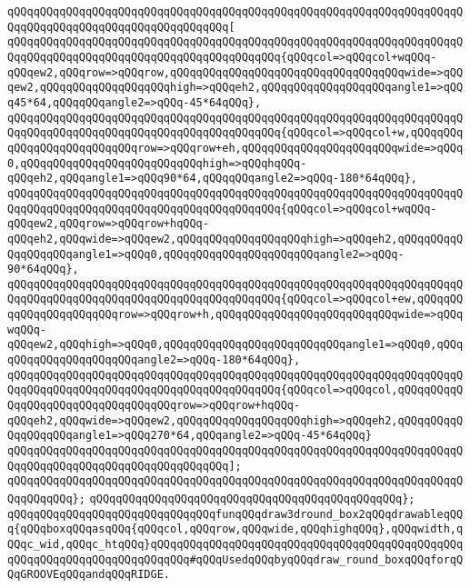 \verb|qQQqqQQqqQQqqQQqqQQqqQQqqQQqqQQqqQQqqQQqqQQqqQQqqQQqqQQqqQQqqQQqqQQqqQQqqQQqqQQqqQQqqQQqqQQqqQQqqQQqqQQq[|\newline
\verb|qQQqqQQqqQQqqQQqqQQqqQQqqQQqqQQqqQQqqQQqqQQqqQQqqQQqqQQqqQQqqQQqqQQqqQQqqQQqqQQqqQQqqQQqqQQqqQQqqQQqqQQqqQQqqQQq{qQQqcol=>qQQqcol+wqQQq-qQQqew2,qQQqrow=>qQQqrow,qQQqqQQqqQQqqQQqqQQqqQQqqQQqqQQqqQQqwide=>qQQqew2,qQQqqQQqqQQqqQQqqQQqhigh=>qQQqeh2,qQQqqQQqqQQqqQQqqQQqangle1=>qQQq45*64,qQQqqQQqangle2=>qQQq-45*64qQQq},|\newline
\verb|qQQqqQQqqQQqqQQqqQQqqQQqqQQqqQQqqQQqqQQqqQQqqQQqqQQqqQQqqQQqqQQqqQQqqQQqqQQqqQQqqQQqqQQqqQQqqQQqqQQqqQQqqQQqqQQq{qQQqcol=>qQQqcol+w,qQQqqQQqqQQqqQQqqQQqqQQqqQQqrow=>qQQqrow+eh,qQQqqQQqqQQqqQQqqQQqqQQqwide=>qQQq0,qQQqqQQqqQQqqQQqqQQqqQQqqQQqhigh=>qQQqhqQQq-qQQqeh2,qQQqangle1=>qQQq90*64,qQQqqQQqangle2=>qQQq-180*64qQQq},|\newline
\verb|qQQqqQQqqQQqqQQqqQQqqQQqqQQqqQQqqQQqqQQqqQQqqQQqqQQqqQQqqQQqqQQqqQQqqQQqqQQqqQQqqQQqqQQqqQQqqQQqqQQqqQQqqQQqqQQq{qQQqcol=>qQQqcol+wqQQq-qQQqew2,qQQqrow=>qQQqrow+hqQQq-qQQqeh2,qQQqwide=>qQQqew2,qQQqqQQqqQQqqQQqqQQqhigh=>qQQqeh2,qQQqqQQqqQQqqQQqqQQqangle1=>qQQq0,qQQqqQQqqQQqqQQqqQQqqQQqangle2=>qQQq-90*64qQQq},|\newline
\verb|qQQqqQQqqQQqqQQqqQQqqQQqqQQqqQQqqQQqqQQqqQQqqQQqqQQqqQQqqQQqqQQqqQQqqQQqqQQqqQQqqQQqqQQqqQQqqQQqqQQqqQQqqQQqqQQq{qQQqcol=>qQQqcol+ew,qQQqqQQqqQQqqQQqqQQqqQQqrow=>qQQqrow+h,qQQqqQQqqQQqqQQqqQQqqQQqqQQqwide=>qQQqwqQQq-qQQqew2,qQQqhigh=>qQQq0,qQQqqQQqqQQqqQQqqQQqqQQqqQQqangle1=>qQQq0,qQQqqQQqqQQqqQQqqQQqqQQqangle2=>qQQq-180*64qQQq},|\newline
\verb|qQQqqQQqqQQqqQQqqQQqqQQqqQQqqQQqqQQqqQQqqQQqqQQqqQQqqQQqqQQqqQQqqQQqqQQqqQQqqQQqqQQqqQQqqQQqqQQqqQQqqQQqqQQqqQQq{qQQqcol=>qQQqcol,qQQqqQQqqQQqqQQqqQQqqQQqqQQqqQQqqQQqrow=>qQQqrow+hqQQq-qQQqeh2,qQQqwide=>qQQqew2,qQQqqQQqqQQqqQQqqQQqhigh=>qQQqeh2,qQQqqQQqqQQqqQQqqQQqangle1=>qQQq270*64,qQQqangle2=>qQQq-45*64qQQq}|\newline
\verb|qQQqqQQqqQQqqQQqqQQqqQQqqQQqqQQqqQQqqQQqqQQqqQQqqQQqqQQqqQQqqQQqqQQqqQQqqQQqqQQqqQQqqQQqqQQqqQQqqQQqqQQq];|\newline
\verb|qQQqqQQqqQQqqQQqqQQqqQQqqQQqqQQqqQQqqQQqqQQqqQQqqQQqqQQqqQQqqQQqqQQqqQQqqQQqqQQq};|\newline
\verb|qQQqqQQqqQQqqQQqqQQqqQQqqQQqqQQqqQQqqQQqqQQqqQQq};|\newline
\newline
\newline
\verb|qQQqqQQqqQQqqQQqqQQqqQQqqQQqqQQqfunqQQqdraw3dround_box2qQQqdrawableqQQq{qQQqboxqQQqasqQQq{qQQqcol,qQQqrow,qQQqwide,qQQqhighqQQq},qQQqwidth,qQQqc_wid,qQQqc_htqQQq}qQQqqQQqqQQqqQQqqQQqqQQqqQQqqQQqqQQqqQQqqQQqqQQqqQQqqQQqqQQqqQQqqQQqqQQqqQQq#qQQqUsedqQQqbyqQQqdraw_round_boxqQQqforqQQqGROOVEqQQqandqQQqRIDGE.|\newline
